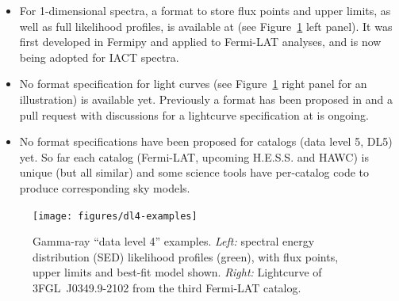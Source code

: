 \begin{itemize}
\item{} For 1-dimensional spectra, a format to store flux points and upper limits, as well as full likelihood profiles, is available at \gadf (see Figure~\ref{fig:dl4-examples} left panel). It was first developed in Fermipy and applied to Fermi-LAT analyses, and is now being adopted for IACT spectra.
\item{} No format specification for light curves (see Figure~\ref{fig:dl4-examples} right panel for an illustration) is available yet. Previously a format has been proposed in \cite{2010AnA...524A..48T} and a pull request with discussions for a lightcurve specification at \gadf is ongoing.
\item{} No format specifications have been proposed for catalogs (data level 5, DL5) yet. So far each catalog (Fermi-LAT, upcoming H.E.S.S. and HAWC) is unique (but all similar) and some science tools have per-catalog code to produce corresponding sky models.
\end{itemize}

\begin{figure}[tb]
\centerline{\texttt{[image: figures/dl4-examples]}}
\caption{
Gamma-ray ``data level 4'' examples. \emph{Left:} spectral energy distribution (SED) likelihood profiles (green), with flux points, upper limits and best-fit model shown. \emph{Right:} Lightcurve of 3FGL~J0349.9-2102 from the third Fermi-LAT catalog.
}
\label{fig:dl4-examples}
\end{figure}
